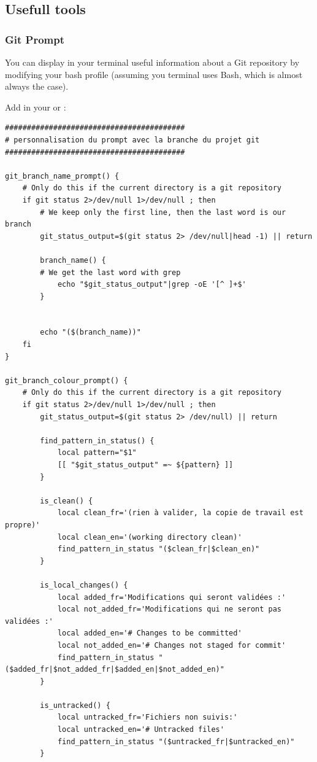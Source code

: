 \documentclass[english,a4paper,twoside]{article}
\begin{document}
\subsection{Usefull tools}
\subsubsection{Git Prompt}
You can display in your terminal useful information about a Git repository by modifying your bash profile (assuming you terminal uses Bash, which is almost always the case).

Add in your  or :
\begin{verbatim}
#########################################
# personnalisation du prompt avec la branche du projet git
#########################################

git_branch_name_prompt() {
    # Only do this if the current directory is a git repository
    if git status 2>/dev/null 1>/dev/null ; then
        # We keep only the first line, then the last word is our branch
        git_status_output=$(git status 2> /dev/null|head -1) || return

        branch_name() {
        # We get the last word with grep
            echo "$git_status_output"|grep -oE '[^ ]+$' 
        }
    
    
        echo "($(branch_name))"
    fi
}

git_branch_colour_prompt() {
    # Only do this if the current directory is a git repository
    if git status 2>/dev/null 1>/dev/null ; then
        git_status_output=$(git status 2> /dev/null) || return

        find_pattern_in_status() {
            local pattern="$1"
            [[ "$git_status_output" =~ ${pattern} ]]
        }

        is_clean() {
            local clean_fr='(rien à valider, la copie de travail est propre)'
            local clean_en='(working directory clean)'
            find_pattern_in_status "($clean_fr|$clean_en)"
        }

        is_local_changes() {
            local added_fr='Modifications qui seront validées :'
            local not_added_fr='Modifications qui ne seront pas validées :'
            local added_en='# Changes to be committed'
            local not_added_en='# Changes not staged for commit'
            find_pattern_in_status "($added_fr|$not_added_fr|$added_en|$not_added_en)"
        }

        is_untracked() {
            local untracked_fr='Fichiers non suivis:'
            local untracked_en='# Untracked files'
            find_pattern_in_status "($untracked_fr|$untracked_en)"
        }


\end{verbatim}
\end{document}
